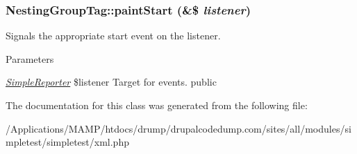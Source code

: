 \hypertarget{class_nesting_group_tag_af2f93c4f4e8003733dee086baf9179c4}{
\subsubsection[{paintStart}]{\setlength{\rightskip}{0pt plus 5cm}NestingGroupTag::paintStart (\&\$ {\em listener})}}
\label{class_nesting_group_tag_af2f93c4f4e8003733dee086baf9179c4}
Signals the appropriate start event on the listener. 
\begin{DoxyParams}{Parameters}
\item[{\em \hyperlink{class_simple_reporter}{SimpleReporter}}]\$listener Target for events.  public \end{DoxyParams}


The documentation for this class was generated from the following file:\begin{DoxyCompactItemize}
\item 
/Applications/MAMP/htdocs/drump/drupalcodedump.com/sites/all/modules/simpletest/simpletest/xml.php\end{DoxyCompactItemize}
